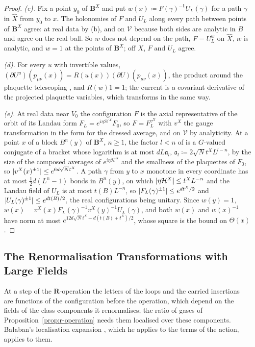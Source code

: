 \documentclass[11pt]{preprint}
\DeclarePairedDelimiter{\abs}{\lvert}{\rvert}
\numberwithin{equation}{section}
\theoremstyle{definition}
\theoremstyle{remark}
\theoremstyle{plain}
\begin{document}
\begin{proof}
\emph{(c).} Fix a point $y_0$ of $\mathbf B^X$ and put $w(x) \coloneqq F(\gamma)^{-1}U_L(\gamma)$ for a path $\gamma$ in $\hat X$ from $y_0$ to $x$. The holonomies of $F$ and $U_L$ along every path between points of $\mathbf B^X$ agree: at real data by (b), and on $\mathcal V$ because both sides are analytic in $B$ and agree on the real ball. So $w$ does not depend on the path, $F = U_L^w$ on $\hat X$, $w$ is analytic, and $w = 1$ at the points of $\mathbf B^X$; off $X$, $F$ and $U_L$ agree.

\emph{(d).} For every $u$ with invertible values, $(\partial U^u)(p_{\mu\nu}(x)) = R(u(x))(\partial U)(p_{\mu\nu}(x))$, the product around the plaquette telescoping \cite[p.~77, l.~48]{BalabanREG}, and $R(w)1 = 1$; the current is a covariant derivative of the projected plaquette variables, which transforms in the same way.

\emph{(e).} At real data near $V_0$ the configuration $F$ is the axial representative of the orbit of its Landau form $F_L = e^{i\eta\mathcal H^X}F_0$, so $F = F_L^{v^X}$ with $v^X$ the gauge transformation \cite[(106)]{BalabanAVG} in the form for the dressed average, and on $\mathcal V$ by analyticity. At a point $x$ of a block $B^n(y)$ of $\mathbf B^X$, $n \geq 1$, the factor $l < n$ of \cite[(106)]{BalabanAVG} is a $G$-valued conjugate of a bracket whose logarithm is at most $dL\mathfrak a_l$, $\mathfrak a_l \coloneqq 2\sqrt Nt^XL^{l-n}$, by the size of the composed averages of $e^{i\eta\mathcal H^X}$ and the smallness of the plaquettes of $F_0$, so $\abs{v^X(x)^{\pm1}} \leq e^{6d\sqrt Nt^X}$. A path $\gamma$ from $y$ to $x$ monotone in every coordinate has at most $\frac12d(L^n - 1)$ bonds in $B^n(y)$, on which $\abs{\eta\mathcal H^X} \leq t^XL^{-n}$ and the Landau field of $U_L$ is at most $t(B)L^{-n}$, so $\abs{F_L(\gamma)^{\pm1}} \leq e^{dt^X/2}$ and $\abs{U_L(\gamma)^{\pm1}} \leq e^{dt(B)/2}$, the real configurations being unitary. Since $w(y) = 1$, $w(x) = v^X(x)F_L(\gamma)^{-1}v^X(y)^{-1}U_L(\gamma)$, and both $w(x)$ and $w(x)^{-1}$ have norm at most $e^{12d\sqrt Nt^X + d(t(B) + t^X)/2}$, whose square is the bound on $\Theta(x)$.
\end{proof}

\subsection{The Renormalisation Transformations with Large Fields}

At a step of the $\mathbf R$-operation the letters of the loops and the carried insertions are functions of the configuration before the operation, which depend on the fields of the class components it renormalises; the ratio of gases of Proposition~\ref{prop:r-operation} needs them localised over these components. Ba{\l}aban's localisation expansion \cite[pp.~372--376]{BalabanLFR2}, which he applies to the terms of the action, applies to them.
\end{document}
